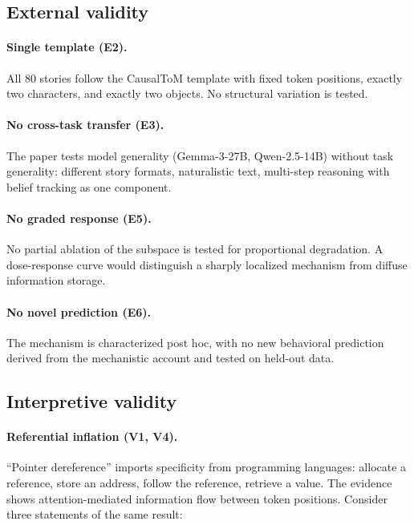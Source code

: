 \documentclass[11pt]{article}
\begin{document}
\subsection{External validity}

\paragraph{Single template (E2).}
All 80 stories follow the CausalToM template with fixed token positions, exactly two characters, and exactly two objects. No structural variation is tested.

\paragraph{No cross-task transfer (E3).}
The paper tests model generality (Gemma-3-27B, Qwen-2.5-14B) without task generality: different story formats, naturalistic text, multi-step reasoning with belief tracking as one component.

\paragraph{No graded response (E5).}
No partial ablation of the subspace is tested for proportional degradation. A dose-response curve would distinguish a sharply localized mechanism from diffuse information storage.

\paragraph{No novel prediction (E6).}
The mechanism is characterized post hoc, with no new behavioral prediction derived from the mechanistic account and tested on held-out data.

\subsection{Interpretive validity}

\paragraph{Referential inflation (V1, V4).}
``Pointer dereference'' imports specificity from programming languages: allocate a reference, store an address, follow the reference, retrieve a value. The evidence shows attention-mediated information flow between token positions. Consider three statements of the same result:
\end{document}
